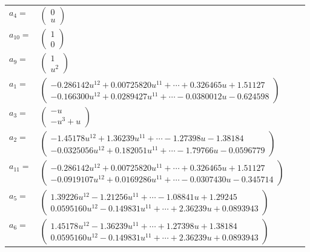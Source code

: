 \documentclass[1p]{elsarticle_modified}
\theoremstyle{definition}
\begin{document}
\begin{tabular}{m{7pt} m{180pt} m{7pt} m{180pt} }
\flushright $a_{4}=$&$\begin{pmatrix}0\\u\end{pmatrix}$ \\
\flushright $a_{10}=$&$\begin{pmatrix}1\\0\end{pmatrix}$ \\
\flushright $a_{9}=$&$\begin{pmatrix}1\\u^2\end{pmatrix}$ \\
\flushright $a_{1}=$&$\begin{pmatrix}-0.286142 u^{12}+0.00725820 u^{11}+\cdots+0.326465 u+1.51127\\-0.166300 u^{12}+0.0289427 u^{11}+\cdots-0.0380012 u-0.624598\end{pmatrix}$ \\
\flushright $a_{3}=$&$\begin{pmatrix}- u\\- u^3+u\end{pmatrix}$ \\
\flushright $a_{2}=$&$\begin{pmatrix}-1.45178 u^{12}+1.36239 u^{11}+\cdots-1.27398 u-1.38184\\-0.0325056 u^{12}+0.182051 u^{11}+\cdots-1.79766 u-0.0596779\end{pmatrix}$ \\
\flushright $a_{11}=$&$\begin{pmatrix}-0.286142 u^{12}+0.00725820 u^{11}+\cdots+0.326465 u+1.51127\\-0.0919107 u^{12}+0.0169286 u^{11}+\cdots-0.0307430 u-0.345714\end{pmatrix}$ \\
\flushright $a_{5}=$&$\begin{pmatrix}1.39226 u^{12}-1.21256 u^{11}+\cdots-1.08841 u+1.29245\\0.0595160 u^{12}-0.149831 u^{11}+\cdots+2.36239 u+0.0893943\end{pmatrix}$ \\
\flushright $a_{6}=$&$\begin{pmatrix}1.45178 u^{12}-1.36239 u^{11}+\cdots+1.27398 u+1.38184\\0.0595160 u^{12}-0.149831 u^{11}+\cdots+2.36239 u+0.0893943\end{pmatrix}$ \\

\end{tabular}
\end{document}
